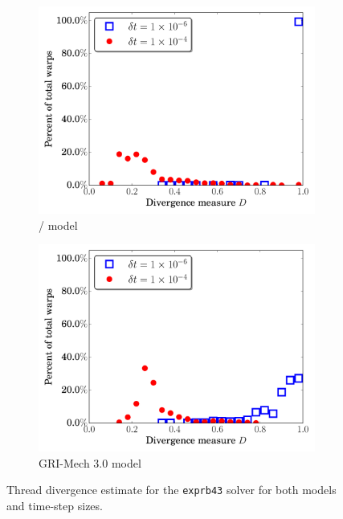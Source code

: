 \documentclass[preprint]{elsarticle}
\begin{document}
\begin{figure}[htb]
  \centering
  \begin{subfigure}{0.49\textwidth}
      \includegraphics[width=\linewidth]{H2_exprb43_div.pdf}
      \caption{\slash{} model}
  \end{subfigure}
  \begin{subfigure}{0.49\textwidth}
      \includegraphics[width=\linewidth]{CH4_exprb43_div.pdf}
      \caption{GRI-Mech 3.0 model}
  \end{subfigure}
  \caption{Thread divergence estimate for the \texttt{exprb43} solver for both models and time-step sizes.}
  \label{F:exp_divergence}
\end{figure}
\end{document}
